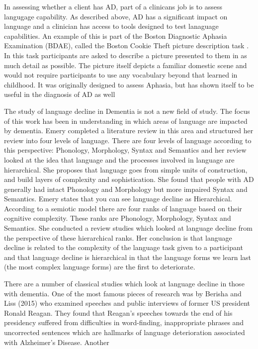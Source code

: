 \documentclass[a4paper]{article}
\begin{document}
\par
In assessing whether a client has AD, part of a clinicans job is to assess langugage capability. As described above, AD has a significant impact on language and a clinician has access to tools designed to test lanaguage capabilities. An example of this is part of the Boston Diagnostic Aphasia Examination (BDAE), called the Boston Cookie Theft picture description task \cite{} . In this task participants are asked to describe a picture presented to them in as much detail as possible. The picture itself depicts a familiar domestic scene and would not require participants to use any vocabulary beyond that learned in childhood. It was originally designed to assess Aphasia, but has shown itself to be useful in the diagnosis of AD as well \cite{GilesPattersonHodges1995}\newline
\par
The study of language decline in Dementia is not a new field of study. The focus of this work has been in understanding in which areas of language are impacted by dementia. Emery \cite{Emery2000} completed a literature review in this area and structured her review into four levels of language. There are four levels of language according to this perspective: Phonology, Morphology, Syntax and Semantics and her review looked at the idea that language and the processes involved in language are hierarchical. She proposes that language goes from simple units of construction, and build layers of complexity and sophistication. She found that people with AD generally had intact Phonology and Morphology but more impaired Syntax and Semantics. Emery states that you can see language decline as Hierarchical. According to a semiotic model there are four ranks of language based on their cognitive complexity. These ranks are Phonology, Morphology, Syntax and Semantics. She conducted a review studies which looked at language decline from the perspective of these hierarchical ranks. Her conclusion is that language decline is related to the complexity of the language task given to a participant and that language decline is hierarchical in that the language forms we learn last (the most complex language forms) are the first to deteriorate.\newline
\par
There are a number of classical studies which look at language decline in those with dementia. One of the most famous pieces of research was by Berisha and Liss (2015) \cite{Berisha2015} who examined speeches and public interviews of former US president Ronald Reagan. They found that Reagan's speeches towards the end of his presidency suffered from difficulties in word-finding, inappropriate phrases and uncorrected sentences which are hallmarks of language deterioration associated with Alzheimer's Disease. Another \newline
\end{document}
